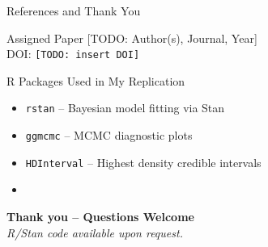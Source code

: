 \documentclass[aspectratio=169,11pt]{beamer}
\newcommand{\paperref}{[TODO: Author(s), Journal, Year]}
\begin{document}
\begin{frame}{References and Thank You}

  \begin{block}{Assigned Paper}
    \small
    \paperref\\
    \vspace{3pt}
    DOI: \texttt{[TODO: insert DOI]}
  \end{block}

  \vspace{5pt}

  \begin{block}{R Packages Used in My Replication}
    \small
    \begin{itemize}
      \item \texttt{rstan} -- Bayesian model fitting via Stan
      \item \texttt{ggmcmc} -- MCMC diagnostic plots
      \item \texttt{HDInterval} -- Highest density credible intervals
      \item [TODO: any additional packages used]
    \end{itemize}
  \end{block}

  \vspace{8pt}

  \begin{center}
    {\large\bfseries\color{qumaroon} Thank you -- Questions Welcome}\\
    \small\textit{R/Stan code available upon request.}
  \end{center}

\end{frame}

\end{document}
